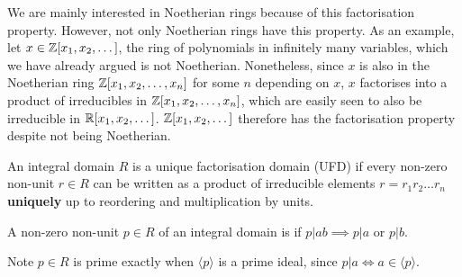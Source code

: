 We are mainly interested in Noetherian rings because of this factorisation property. However, not only Noetherian rings have this property. As an example, let $x\in \mathbb{Z}[x_1,x_2,\dots]$, the ring of polynomials in infinitely many variables, which we have already argued is not Noetherian. Nonetheless, since $x$ is also in the Noetherian ring $\mathbb{Z}[x_1,x_2,\dots,x_n]$ for some $n$ depending on $x$, $x$ factorises into a product of irreducibles in $\mathbb{Z}[x_1,x_2,\dots,x_n]$, which are easily seen to also be irreducible in $\mathbb{R}[x_1,x_2,\dots]$. $\mathbb{Z}[x_1,x_2,\dots]$ therefore has the factorisation property despite not being Noetherian.


\begin{definition}
An integral domain $R$ is a unique factorisation domain (UFD) if every non-zero non-unit $r\in R$ can be written as a product of irreducible elements $r=r_1r_2\dots r_n$ \textbf{uniquely} up to reordering and multiplication by units.
\end{definition}
\begin{definition}
A non-zero non-unit $p\in R$ of an integral domain is  if $p|ab\implies p|a$ or $p|b$. 
\end{definition}
\begin{remark}
Note $p\in R$ is prime exactly when $\langle p \rangle $ is a prime ideal, since $p|a \iff a\in \langle p \rangle$.
\end{remark}



